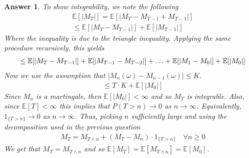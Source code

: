 \documentclass[12pt]{article}
\theoremstyle{colon}
\newtheorem*{answer}{Answer}
\begin{document}
\begin{answer}
  To show integrability, we note the following
  \begin{gather*}
    \mathbb{E}[ \lvert M_T \rvert ] = \mathbb{E}[ \lvert M_T - M_{T-1} + M_{T-1} \rvert ] \\
    \leq \mathbb{E}[ \lvert M_T - M_{T-1} \vert ] + \mathbb{E}[ \lvert M_{T-1} \rvert ]
  \end{gather*}
  Where the inequality is due to the triangle inequality. Applying the same procedure recursively, this yields
  \begin{gather*}
    \leq \mathbb{E}[ \lvert M_T - M_{T-1} \vert ] + \mathbb{E}[ \lvert M_{T-1} - M_{T-2} \rvert ] + \mathellipsis + \mathbb{E}[ \lvert M_1 - M_0 \rvert ] + \mathbb{E}[ \lvert M_0 \rvert ]
  \end{gather*}
  Now we use the assumption that $\lvert M_n(\omega) - M_{n-1}(\omega) \rvert \leq K$.
  \begin{gather*}
    \leq T \cdot K + \mathbb{E}[ \lvert M_0 \rvert ]
  \end{gather*}
  Since $M_n$ is a martingale, then $\mathbb{E}[ \lvert M_0 \rvert ] < \infty$ and so $M_T$ is integrable. Also, since $\mathbb{E}[T] < \infty$ this implies that $P(T > n) \rightarrow 0$ as $n \rightarrow \infty$. Equivalently, $1_{ \{ T > n \} } \rightarrow 0$ as $n \rightarrow \infty$. Thus, picking $n$ sufficiently large and using the decomposition used in the previous question
  \begin{gather*}
    M_T = M_{T \land n} + (M_T - M_n) \cdot 1_{ \{ T > n \} } \quad \forall n \geq 0
  \end{gather*}
  We get that $M_T = M_{T \land n}$ and so $\mathbb{E}[M_T] = \mathbb{E}[M_{T \land n}] = \mathbb{E}[M_0]$.
\end{answer}
\end{document}
